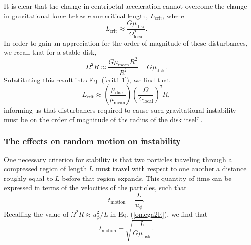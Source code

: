 \documentclass[aps,pra, twocolumn]{revtex4-1}
\begin{document}
It is clear that the change in centripetal acceleration cannot overcome the change in gravitational force below some critical length, $L_\text{crit}$, where
\begin{equation}
L_\text{crit} \approx \frac{G \mu_\text{disk}}{\Omega_\text{local}^2}. \label{crit1.1}
\end{equation}
In order to gain an appreciation for the order of magnitude of these disturbances, we recall that for a stable disk,
\begin{equation}
\Omega^2 R \approx \frac{G\mu_\text{mean} R^2}{R^2} = G\mu_\text{disk}. \label{omega2R}
\end{equation}
Substituting this result into Eq. (\ref{crit1.1}), we find that
\begin{equation}
L_\text{crit} \approx \left(\frac{\mu_\text{disk}}{\mu_\text{mean}}\right)\left(\frac{\Omega}{\Omega_\text{local}}\right)^2 R,
\end{equation}
informing us that disturbances required to cause such gravitational instability must be on the order of magnitude of the radius of the disk itself \cite{toomre1964}.


\subsubsection{\label{section 3.1.2} The effects on random motion on instability}
One necessary criterion for stability is that two particles traveling through a compressed region of length $L$ must travel with respect to one another a distance roughly equal to $L$ before that region expands.  This quantity of time can be expressed in terms of the velocities of the particles, such that 
\begin{equation}
t_\text{motion} = \frac{L}{u_\phi}. \nonumber
\end{equation}
Recalling the value of $\Omega^2 R \approx  u_\phi^2 / L$ in Eq. (\ref{omega2R}), we find that
\begin{equation}
t_\text{motion} = \sqrt{\frac{L}{G\mu_\text{disk}}}.
\end{equation}
\end{document}
